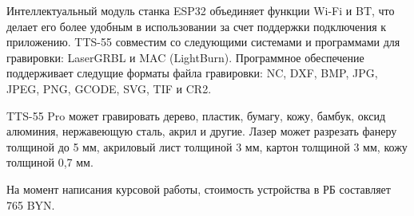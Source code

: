 Интеллектуальный модуль станка ESP32 объединяет функции Wi-Fi и BT, 
что делает его более удобным в использовании за счет поддержки подключения к приложению.
TTS-55 совместим со следующими системами и программами для гравировки: LaserGRBL и MAC (LightBurn).
Программное обеспечение поддерживает следущие форматы файла гравировки: NC, DXF, BMP, JPG, JPEG, PNG, GCODE, SVG, TIF и CR2.

TTS-55 Pro может гравировать дерево, пластик, бумагу, кожу, бамбук, оксид алюминия, нержавеющую сталь, акрил и другие. 
Лазер может разрезать фанеру толщиной до 5 мм, акриловый лист толщиной 3 мм, картон толщиной 3 мм, кожу толщиной 0,7 мм.

На момент написания курсовой работы, стоимость устройства в РБ составляет 765 BYN.